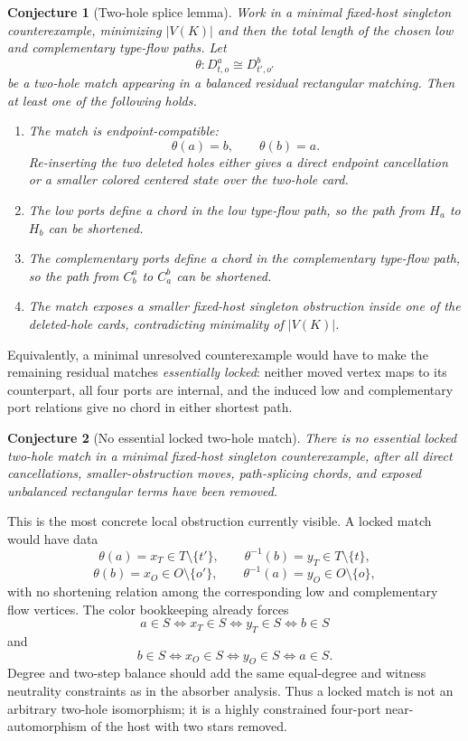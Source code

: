 \documentclass[11pt]{article}
\newtheorem{conjecture}{Conjecture}
\begin{document}
\begin{conjecture}[Two-hole splice lemma]
Work in a minimal fixed-host singleton counterexample, minimizing
\(|V(K)|\) and then the total length of the chosen low and complementary
type-flow paths.  Let
\[
  \theta:D_{t,o}^a\cong D_{t',o'}^b
\]
be a two-hole match appearing in a balanced residual rectangular matching.
Then at least one of the following holds.

\begin{enumerate}[leftmargin=2em]
  \item The match is endpoint-compatible:
  \[
    \theta(a)=b,\qquad \theta(b)=a.
  \]
  Re-inserting the two deleted holes either gives a direct endpoint
  cancellation or a smaller colored centered state over the two-hole card.

  \item The low ports define a chord in the low type-flow path, so the path
  from \(H_a\) to \(H_b\) can be shortened.

  \item The complementary ports define a chord in the complementary type-flow
  path, so the path from \(C_b^a\) to \(C_a^b\) can be shortened.

  \item The match exposes a smaller fixed-host singleton obstruction inside
  one of the deleted-hole cards, contradicting minimality of \(|V(K)|\).
\end{enumerate}
\end{conjecture}

Equivalently, a minimal unresolved counterexample would have to make the
remaining residual matches \emph{essentially locked}: neither moved vertex
maps to its counterpart, all four ports are internal, and the induced low and
complementary port relations give no chord in either shortest path.

\begin{conjecture}[No essential locked two-hole match]
There is no essential locked two-hole match in a minimal fixed-host singleton
counterexample, after all direct cancellations, smaller-obstruction moves,
path-splicing chords, and exposed unbalanced rectangular terms have been
removed.
\end{conjecture}

This is the most concrete local obstruction currently visible.  A locked
match would have data
\[
  \theta(a)=x_T\in T\setminus\{t'\},
  \qquad
  \theta^{-1}(b)=y_T\in T\setminus\{t\},
\]
\[
  \theta(b)=x_O\in O\setminus\{o'\},
  \qquad
  \theta^{-1}(a)=y_O\in O\setminus\{o\},
\]
with no shortening relation among the corresponding low and complementary
flow vertices.  The color bookkeeping already forces
\[
  a\in S \Longleftrightarrow x_T\in S
  \Longleftrightarrow y_T\in S
  \Longleftrightarrow b\in S
\]
and
\[
  b\in S \Longleftrightarrow x_O\in S
  \Longleftrightarrow y_O\in S
  \Longleftrightarrow a\in S.
\]
Degree and two-step balance should add the same equal-degree and witness
neutrality constraints as in the absorber analysis.  Thus a locked match is
not an arbitrary two-hole isomorphism; it is a highly constrained
four-port near-automorphism of the host with two stars removed.
\end{document}
